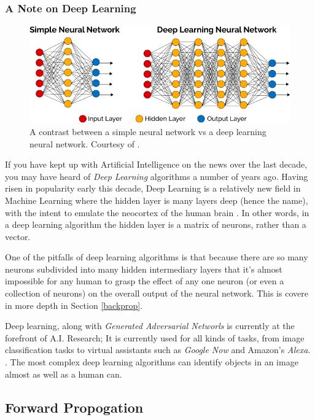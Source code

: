 \documentclass[12pt]{article}
\begin{document}
\subsubsection{A Note on Deep Learning}

\begin{figure}[h]
    \centering
    \includegraphics[width=\textwidth]{DeepLearning-diagram.png}
    \caption{A contrast between a simple neural network vs a deep learning neural network. Courtesy of \textcite{vazquez17}. \label{deeplearningfig}}
\end{figure}

If you have kept up with Artificial Intelligence on the news over the last decade, you may have heard of \textit{Deep Learning} algorithms a number of years ago. Having risen in popularity early this decade, Deep Learning is a relatively new field in Machine Learning where the hidden layer is many layers deep (hence the name), with the intent to emulate the neocortex of the human brain \textcite{Hof2013}. In other words, in a deep learning algorithm the hidden layer is a matrix of neurons, rather than a vector.

One of the pitfalls of deep learning algorithms is that because there are so many neurons subdivided into many hidden intermediary layers that it's almost impossible for any human to grasp the effect of any one neuron (or even a collection of neurons) on the overall output of the neural network. This is covere in more depth in Section \ref{backprop}.

Deep learning, along with \textit{Generated Adversarial Networls} is currently at the forefront of A.I. Research; It is currently used for all kinds of tasks, from image classification tasks to virtual assistants such as \textit{Google Now} and Amazon's \textit{Alexa}. \textcite{vazquez17}. The most complex deep learning algorithms can identify objects in an image almost as well as a human can.

\subsection{Forward Propogation \label{foreprop}}
\end{document}

